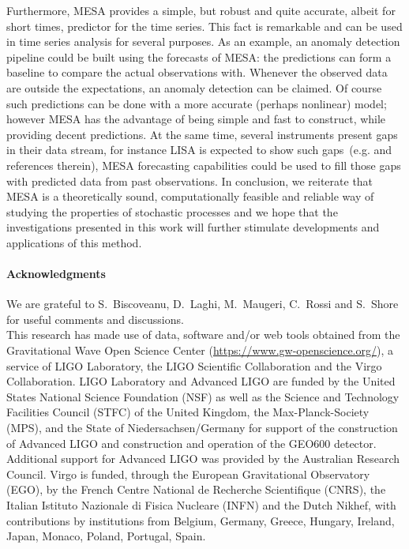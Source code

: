 \documentclass[epj,nopacs]{svjour}
\begin{document}
Furthermore, MESA provides a simple, but robust and quite accurate, albeit for short times, predictor for the time series. This fact is remarkable and can be used in time series analysis for several purposes. As an example, an anomaly detection pipeline could be built using the forecasts of MESA: the predictions can form a baseline to compare the actual observations with. Whenever the observed data are outside the expectations, an anomaly detection can be claimed. Of course such predictions can be done with a more accurate (perhaps nonlinear) model; however MESA has the advantage of being simple and fast to construct, while providing decent predictions. At the same time, several instruments present gaps in their data stream, for instance LISA is expected to show such gaps~(e.g. \cite{lisa_gaps} and references therein), MESA forecasting capabilities could be used to fill those gaps with predicted data from past observations. In conclusion, we reiterate that MESA is a theoretically sound, computationally feasible and reliable way of studying the properties of stochastic processes and we hope that the investigations presented in this work will further stimulate developments and applications of this method.

\paragraph{Acknowledgments}
We are grateful to S.~Biscoveanu, D.~Laghi, M.~Maugeri, C.~Rossi and S.~Shore for useful comments and discussions.\\
This research has made use of data, software and/or web tools obtained from the Gravitational Wave Open Science Center (\url{https://www.gw-openscience.org/}), a service of LIGO Laboratory, the LIGO Scientific Collaboration and the Virgo Collaboration. LIGO Laboratory and Advanced LIGO are funded by the United States National Science Foundation (NSF) as well as the Science and Technology Facilities Council (STFC) of the United Kingdom, the Max-Planck-Society (MPS), and the State of Niedersachsen/Germany for support of the construction of Advanced LIGO and construction and operation of the GEO600 detector. Additional support for Advanced LIGO was provided by the Australian Research Council. Virgo is funded, through the European Gravitational Observatory (EGO), by the French Centre National de Recherche Scientifique (CNRS), the Italian Istituto Nazionale di Fisica Nucleare (INFN) and the Dutch Nikhef, with contributions by institutions from Belgium, Germany, Greece, Hungary, Ireland, Japan, Monaco, Poland, Portugal, Spain.
\end{document}
